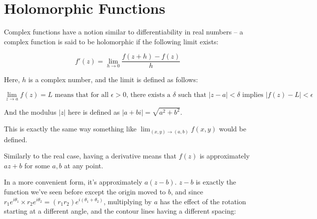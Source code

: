 \documentclass[xhtml, mathjax]{article}
\begin{document}
  \section{Holomorphic Functions}

    Complex functions have a notion similar to differentiability in real numbers
    -- a complex function is said to be holomorphic if the following limit
    exists:

    \[f'(z) = \lim_{h \to 0} \frac{f(z+h) - f(z)}{h}\]

    Here, $h$ is a complex number, and the limit is defined as follows:

    \[\lim_{z \to a}f(z) = L \text{ means that for all } \epsilon > 0 \text{,
    there exists a } \delta \text{ such that } |z - a| < \delta \text{ implies }
    |f(z) - L| < \epsilon\]

    And the modulus $|z|$ here is defined as $|a+bi| = \sqrt{a^2+b^2}$.

    This is exactly the same way something like $\lim_{(x,y) \to (a,b)} f(x,y)$
    would be defined.

    Similarly to the real case, having a derivative means that $f(z)$ is
    approximately $az + b$ for some $a, b$ at any point.

    In a more convenient form, it's approximately $a(z-b)$. $z-b$ is exactly the
    function we've seen before except the origin moved to $b$, and since
    $r_1e^{i\theta_1} \times r_2e^{i\theta_2} = (r_1 r_2) e^{i(\theta_1 +
    \theta_2)}$, multiplying by $a$ has the effect of the rotation starting at a
    different angle, and the contour lines having a different spacing:
\end{document}
